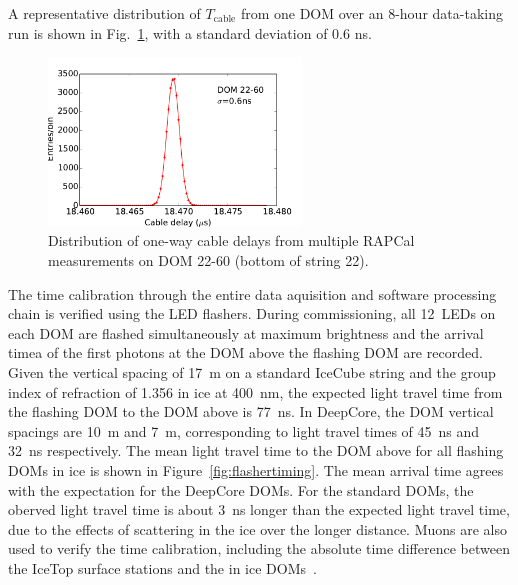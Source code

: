 \noindent A representative distribution of $T_{\mathrm{cable}}$ from one DOM over an 8-hour
data-taking run is shown in Fig.~\ref{fig:rapcal_cable_len}, with a
standard deviation of 0.6 ns.


\begin{figure}[!h]
 \centering
 \includegraphics[width=0.6\textwidth]{graphics/dom/rapcal/tcal_hist_22-60.pdf}
 \caption{Distribution of one-way cable delays from multiple RAPCal
   measurements on DOM 22-60 (bottom of string 22).}
 \label{fig:rapcal_cable_len}
\end{figure}

The time calibration through the entire data aquisition and software
processing chain is verified using the LED flashers. During
commissioning, all 12~LEDs on each DOM are flashed simultaneously at
maximum brightness and the arrival timea of the first photons at the DOM above the flashing DOM
are recorded. Given the vertical spacing of 17~m on a standard IceCube
string and the group index of
refraction of  1.356 in ice at 400~nm, the expected light travel time
from the flashing DOM to the DOM above is 77~ns. In DeepCore, the DOM
vertical spacings are 10~m and 7~m, corresponding to light travel
times of 45~ns and 32~ns respectively. The mean light travel
time to the DOM above for all flashing DOMs in ice is shown in
Figure~\ref{fig:flashertiming}. The mean arrival time agrees with the
expectation for the DeepCore DOMs. For the standard DOMs, the oberved
light travel time is about 3~ns longer than the expected light travel
time, due to the effects of scattering in the ice over the longer distance. Muons are also used to
verify the time calibration, including the absolute time difference
between the IceTop surface stations and the in ice DOMs~\cite{IC3:perf}.

